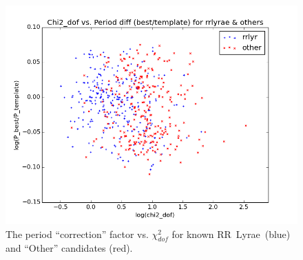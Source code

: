 \documentclass[12pt, preprint]{aastex}
\def\RR  {\hbox{RR Lyrae}}
\begin{document}
\begin{figure}[!t]
\hskip 0.4in
\includegraphics[width=0.9\hsize,clip]{PratChi2.png}
\caption{The period ``correction'' factor vs. $\chi^2_{dof}$ for known \RR\ (blue) and ``Other'' candidates (red).} 
\label{Fig:PratChi2}
\end{figure}
\end{document}
